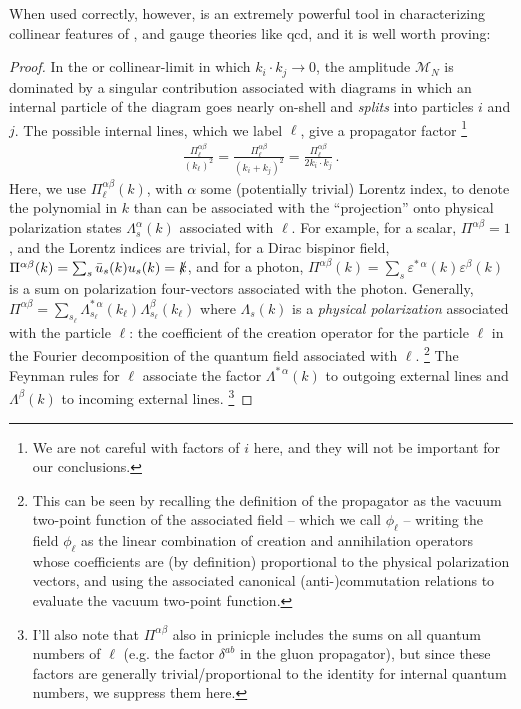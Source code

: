 When used correctly, however,  is an extremely powerful tool in characterizing collinear features of , and gauge theories like \gls{qcd}, and it is well worth proving:

\begin{proof}
In the  or \gls{collinear-limit} in which \(k_i \cdot k_j \to 0\), the amplitude \(\mathcal{M}_N\) is dominated by a singular contribution associated with diagrams in which an internal particle of the diagram goes nearly on-shell and \textit{splits} into particles \(i\) and \(j\).
%
The possible internal lines, which we label \(\ell\), give a propagator factor%
\footnote{
    We are not careful with factors of \(i\) here, and they will not be important for our conclusions.
}
\begin{align}
    \frac{\Pi^{\alpha \beta}_\ell}{(k_\ell)^2}
    =
    \frac{\Pi^{\alpha \beta}_\ell}{(k_i + k_j)^2}
    =
    \frac{\Pi^{\alpha \beta}_\ell}{2 k_i \cdot k_j}
    \,.
\end{align}
Here, we use \(\Pi^{\alpha \beta}_\ell(k)\), with \(\alpha\) some (potentially trivial) Lorentz index, to denote the polynomial in \(k\) than can be associated with the ``projection'' onto physical polarization states \(\Lambda^\alpha_s(k)\) associated with \(\ell\).
%
For example, for a scalar, \(\Pi^{\alpha \beta} = 1\), and the Lorentz indices are trivial, for a Dirac bispinor field, \(\Pi^{\alpha\beta}(k) = \sum_s \bar{u}_s(k) u_s(k) = \slashed{k}\), and for a photon, \(\Pi^{\alpha\beta}(k) = \sum_s \varepsilon^{*\,\alpha}(k)  \varepsilon^\beta(k)\) is a sum on polarization four-vectors associated with the photon.
%
Generally, \(\Pi^{\alpha\beta} = \sum_{s_\ell} \Lambda^{*\,\alpha}_{s_\ell}(k_\ell) \Lambda^\beta_{s_\ell}(k_\ell)\) where \(\Lambda_s(k)\) is a \textit{physical polarization} associated with the particle \(\ell\):
%
the coefficient of the creation operator for the particle \(\ell\) in the Fourier decomposition of the quantum field associated with \(\ell\).%
\footnote{
    This can be seen by recalling the definition of the propagator as the vacuum two-point function of the associated field -- which we call \(\phi_\ell\) -- writing the field \(\phi_\ell\) as the linear combination of creation and annihilation operators whose coefficients are (by definition) proportional to the physical polarization vectors, and using the associated canonical (anti-)commutation relations to evaluate the vacuum two-point function.
}
%
The Feynman rules for \(\ell\) associate the factor \(\Lambda^{*\,\alpha}(k)\) to outgoing external lines and \(\Lambda^\beta(k)\) to incoming external lines.%
\footnote{
    I'll also note that \(\Pi^{\alpha\beta}\) also in prinicple includes the sums on all quantum numbers of \(\ell\) (e.g. the factor \(\delta^{ab}\) in the gluon propagator), but since these factors are generally trivial/proportional to the identity for internal quantum numbers, we suppress them here.
}


\end{proof}
